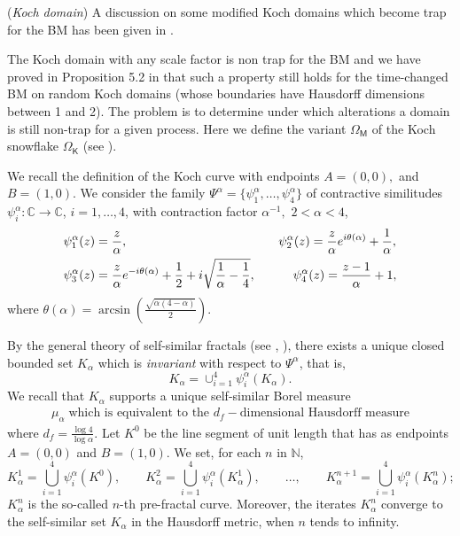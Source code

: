 \documentclass[[11pt,a4paper,reqno]{article}
\newcommand{\N}{{\mathbb N}}
\newcommand{\C}{{\mathbb C}}
\numberwithin{equation}{section}
\begin{document}
({\it Koch domain}) A discussion on some modified Koch domains which become trap for the BM has been given in  \cite{BCM}.

 The Koch domain with any scale factor is non trap for the BM and we have proved in Proposition 5.2 in \cite{CDJEE} that such a property still holds for the time-changed BM on random Koch domains (whose boundaries have Hausdorff dimensions between 1 and 2). The problem is to determine under which alterations a domain is still non-trap for a given process. Here we define the variant $\Omega_\mathsf{M}$ of the  Koch snowflake $\Omega_\mathsf{K}$ (see \cite{BCM}).


We recall the definition of the Koch curve with endpoints $A = (0, 0),$ and $B = (1, 0)$. We consider the family $\Psi^\alpha=\{\psi^\alpha_1,\dots, \psi^\alpha_4\}$ of contractive similitudes  $\psi^\alpha_i:\C \rightarrow\C$, $i=1,\ldots,4$, with contraction factor $\alpha^{-1},$  $2<\alpha<4$, 
$$\aligned&\psi^\alpha_1(z)=\frac{z}{\alpha},\,\quad\quad\quad\quad\quad\quad\quad\quad\quad\quad\quad\quad
\psi^\alpha_2(z)=\frac{z}{\alpha}e^{i\theta(\alpha)}+\frac{1}{\alpha},\\
&\psi^\alpha_3(z)=\frac{z}{\alpha}e^{-
i\theta(\alpha)}+\frac12+i\sqrt{\frac{1}{\alpha}-\frac{1}{4}},\quad\quad\quad
\psi^\alpha_4(z)=\frac{z-1}{\alpha}+1,\endaligned$$
where $\theta(\alpha)=\arcsin\left( 
\frac{\sqrt{\alpha(4-\alpha)}}{2}\right).$

By the general theory of self-similar fractals (see \cite{Fal}, \cite{Kig}), there exists a unique closed bounded set $K_\alpha$ which is {\it invariant\/} with respect to $\Psi^\alpha$, that is, 
\begin{equation}
K_\alpha=\cup^4_{i=1}\psi^\alpha_i(K_\alpha).
\end{equation}
We recall that $K_\alpha$ supports a unique self-similar Borel measure 
\begin{align}
\label{mu-alpha-def}
\mu_\alpha \; \textrm{which is equivalent to the $d_f-$dimensional Hausdorff measure}
\end{align}
where $d_f=\frac{\log 4}{\log \alpha}$. Let $K^0$ be the line segment of unit length that has as endpoints $A=(0,0)$ and  $B=(1,0)$. We set, for each $n$ in $\N$, 
\begin{equation}
\label{Kn}
 K_\alpha^1=\bigcup_{i=1}^4 \psi^\alpha_i(K^0),\qquad
 K_\alpha^2=\bigcup_{i=1}^4 \psi^\alpha_i(K_\alpha^1), \qquad
 \dots, \qquad
 K_\alpha^{n+1}=\bigcup_{i=1}^4 \psi^\alpha_i(K_\alpha^n);
\end{equation}
${K_\alpha^n}$ is the so-called ${n}${-th} {pre-fractal curve}. Moreover, the iterates $K_\alpha^{n}$ converge to the self-similar set $K_\alpha$ in the Hausdorff metric, when $n$ tends to infinity.
\end{document}

